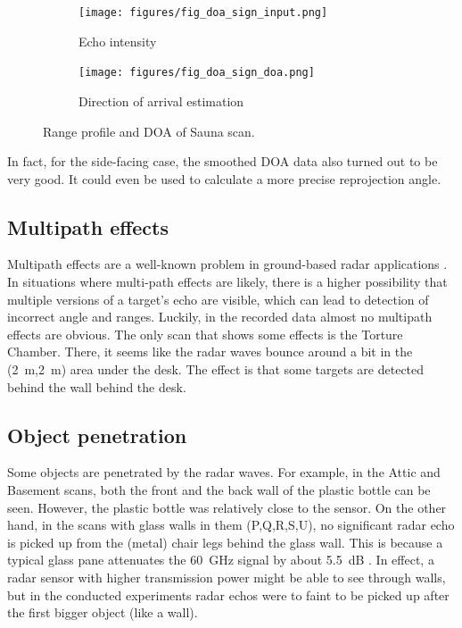 \begin{figure}[htbp]
    \centering
    \begin{subfigure}[b]{0.45\textwidth}
        \texttt{[image: figures/fig\_doa\_sign\_input.png]}
        \caption{\label{fig:sauna_input}Echo intensity}
    \end{subfigure}%
    \hfill%
    \begin{subfigure}[b]{0.45\textwidth}
        \texttt{[image: figures/fig\_doa\_sign\_doa.png]}
        \caption{\label{fig:sauna_doa}Direction of arrival estimation}
    \end{subfigure}
    \caption{Range profile and DOA of Sauna scan.}
    \label{fig:sauna}
\end{figure}

In fact, for the side-facing case, the smoothed DOA data also turned out
to be very good. It could even be used to calculate a more precise
reprojection angle.

\subsection{Multipath effects}\label{multipath-effects}

Multipath effects are a well-known problem in ground-based radar
applications \cite{Adams2012}. In situations where multi-path effects
are likely, there is a higher possibility that multiple versions of a
target's echo are visible, which can lead to detection of incorrect
angle and ranges. Luckily, in the recorded data almost no multipath
effects are obvious. The only scan that shows some effects is the
Torture Chamber. There, it seems like the radar waves bounce around a
bit in the (\SI{2}{m},\SI{2}{m}) area under the desk. The effect is that some targets
are detected behind the wall behind the desk.



\subsection{Object penetration}\label{object-penetration}

Some objects are penetrated by the radar waves. For example, in the
Attic and Basement scans, both the front and the back wall of the
plastic bottle can be seen. However, the plastic bottle was relatively
close to the sensor. On the other hand, in the scans with glass walls in
them (P,Q,R,S,U), no significant radar echo is picked up from the
(metal) chair legs behind the glass wall. This is because a typical
glass pane attenuates the \SI{60}{GHz} signal by about \SI{5.5}{dB} \cite{Lu2014}. In
effect, a radar sensor with higher transmission power might be able to
see through walls, but in the conducted experiments radar echos were to
faint to be picked up after the first bigger object (like a wall).

